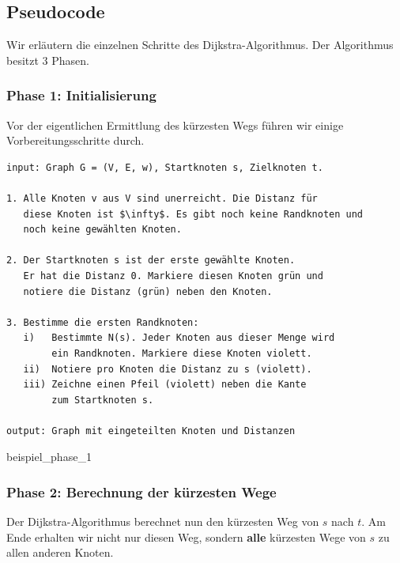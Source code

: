 \subsection{Pseudocode}

Wir erläutern die einzelnen Schritte des Dijkstra-Algorithmus. Der Algorithmus besitzt $3$ Phasen.

\subsubsection{Phase 1: Initialisierung}

Vor der eigentlichen Ermittlung des kürzesten Wegs führen wir einige Vorbereitungsschritte durch.

\begin{lstlisting}[language={pseudocode}, caption={Dijkstra-Algorithmus Phase 1.}, label={lst-algo-shortest-path-dijkstra-phase-1}]
input: Graph G = (V, E, w), Startknoten s, Zielknoten t.

1. Alle Knoten v aus V sind unerreicht. Die Distanz für 
   diese Knoten ist $\infty$. Es gibt noch keine Randknoten und 
   noch keine gewählten Knoten.

2. Der Startknoten s ist der erste gewählte Knoten. 
   Er hat die Distanz 0. Markiere diesen Knoten grün und 
   notiere die Distanz (grün) neben den Knoten.

3. Bestimme die ersten Randknoten:
   i)   Bestimmte N(s). Jeder Knoten aus dieser Menge wird 
        ein Randknoten. Markiere diese Knoten violett.
   ii)  Notiere pro Knoten die Distanz zu s (violett).
   iii) Zeichne einen Pfeil (violett) neben die Kante 
        zum Startknoten s.

output: Graph mit eingeteilten Knoten und Distanzen
\end{lstlisting}

\newpage

{beispiel_phase_1}

\subsubsection{Phase 2: Berechnung der kürzesten Wege}

Der Dijkstra-Algorithmus berechnet nun den kürzesten Weg von $s$ nach $t$. Am Ende erhalten wir nicht nur diesen Weg, sondern \textbf{alle} kürzesten Wege von $s$ zu allen anderen Knoten.

